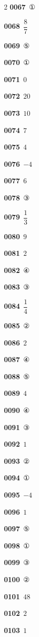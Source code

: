 \documentclass[10pt,a4paper]{article}
\begin{document}
\begin{multicols}{2}
\noindent\textbf{0067}\ ①\par
\noindent\textbf{0068}\ $\dfrac{8}{7}$\par
\noindent\textbf{0069}\ ⑤\par
\noindent\textbf{0070}\ ①\par
\noindent\textbf{0071}\ $0$\par
\noindent\textbf{0072}\ $20$\par
\noindent\textbf{0073}\ $10$\par
\noindent\textbf{0074}\ $7$\par
\noindent\textbf{0075}\ $4$\par
\noindent\textbf{0076}\ $-4$\par
\noindent\textbf{0077}\ $6$\par
\noindent\textbf{0078}\ ③\par
\noindent\textbf{0079}\ $\dfrac{1}{3}$\par
\noindent\textbf{0080}\ $9$\par
\noindent\textbf{0081}\ $2$\par
\noindent\textbf{0082}\ ④\par
\noindent\textbf{0083}\ ③\par
\noindent\textbf{0084}\ $\dfrac{1}{4}$\par
\noindent\textbf{0085}\ ②\par
\noindent\textbf{0086}\ $2$\par
\noindent\textbf{0087}\ ④\par
\noindent\textbf{0088}\ ⑤\par
\noindent\textbf{0089}\ $4$\par
\noindent\textbf{0090}\ ④\par
\noindent\textbf{0091}\ ③\par
\noindent\textbf{0092}\ $1$\par
\noindent\textbf{0093}\ ②\par
\noindent\textbf{0094}\ ①\par
\noindent\textbf{0095}\ $-4$\par
\noindent\textbf{0096}\ $1$\par
\noindent\textbf{0097}\ ⑤\par
\noindent\textbf{0098}\ ①\par
\noindent\textbf{0099}\ ③\par
\noindent\textbf{0100}\ ②\par
\noindent\textbf{0101}\ $48$\par
\noindent\textbf{0102}\ $2$\par
\noindent\textbf{0103}\ $1$\par

\end{multicols}
\end{document}
